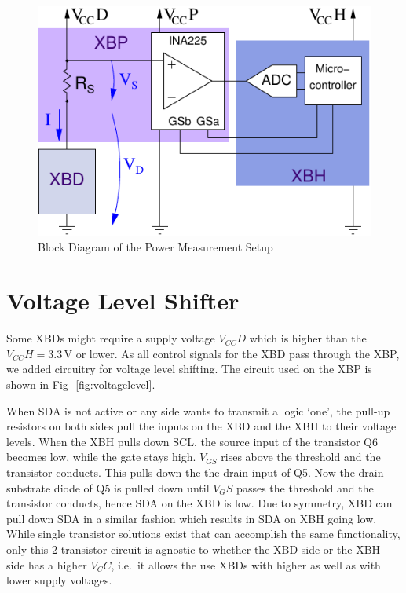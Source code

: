 \documentclass[twoside,11pt]{cergdoc}
\begin{document}
\begin{figure}[ht]
  \begin{center}
    \includegraphics[scale=1]{figures/ina225}
    \caption{Block Diagram of the Power Measurement Setup}\label{fig:block}
  \end{center}
\end{figure}

\section{Voltage Level Shifter}\label{sec:shifter}
Some XBDs might require a supply voltage $V_{CC}D$ which is higher than the $V_{CC}H = 3.3$\,V
or lower. As all control signals for the XBD pass through the XBP, we added circuitry for
voltage level shifting. The circuit used on the XBP is shown in Fig\,~\ref{fig:voltagelevel}. 

When SDA is not active or any side wants to transmit a logic `one', the pull-up resistors on both 
sides pull the inputs on the XBD and the XBH to their voltage levels. 
When the XBH pulls down SCL, the source input of the transistor Q6 becomes low, while the gate stays high. 
$V_{GS}$ rises above the threshold and the transistor conducts. This pulls down the 
the drain input of Q5. Now the drain-substrate diode of Q5 is pulled down until $V_GS$ passes the
threshold and the transistor conducts, hence
SDA on the XBD is low. 
Due to symmetry, XBD can pull down SDA in a similar fashion which results in SDA on XBH going low.
While single transistor solutions exist that can accomplish the same functionality,
only this 2 transistor circuit is agnostic to whether the XBD side or the XBH side has a higher
$V_CC$, i.e.\ it allows the use XBDs with higher as well as with lower supply
voltages. 
\end{document}
